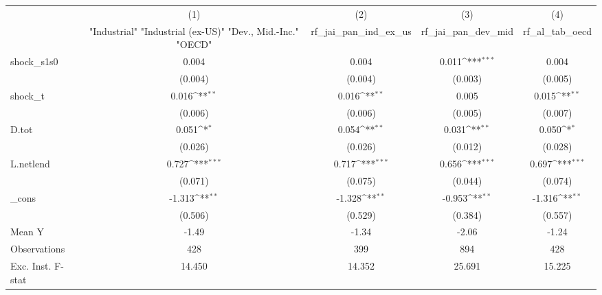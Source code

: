 {
\def\sym#1{\ifmmode^{#1}\else\(^{#1}\)\fi}
\begin{tabular}{l*{4}{c}}
\toprule
            &\multicolumn{1}{c}{(1)}&\multicolumn{1}{c}{(2)}&\multicolumn{1}{c}{(3)}&\multicolumn{1}{c}{(4)}\\
            &\multicolumn{1}{c}{ "Industrial" "Industrial (ex-US)" "Dev., Mid.-Inc." "OECD" }&\multicolumn{1}{c}{rf\_jai\_pan\_ind\_ex\_us}&\multicolumn{1}{c}{rf\_jai\_pan\_dev\_mid}&\multicolumn{1}{c}{rf\_al\_tab\_oecd}\\
\midrule
shock\_s1s0  &       0.004         &       0.004         &       0.011\sym{***}&       0.004         \\
            &     (0.004)         &     (0.004)         &     (0.003)         &     (0.005)         \\
\addlinespace
shock\_t     &       0.016\sym{**} &       0.016\sym{**} &       0.005         &       0.015\sym{**} \\
            &     (0.006)         &     (0.006)         &     (0.005)         &     (0.007)         \\
\addlinespace
D.tot       &       0.051\sym{*}  &       0.054\sym{**} &       0.031\sym{**} &       0.050\sym{*}  \\
            &     (0.026)         &     (0.026)         &     (0.012)         &     (0.028)         \\
\addlinespace
L.netlend   &       0.727\sym{***}&       0.717\sym{***}&       0.656\sym{***}&       0.697\sym{***}\\
            &     (0.071)         &     (0.075)         &     (0.044)         &     (0.074)         \\
\addlinespace
\_cons      &      -1.313\sym{**} &      -1.328\sym{**} &      -0.953\sym{**} &      -1.316\sym{**} \\
            &     (0.506)         &     (0.529)         &     (0.384)         &     (0.557)         \\
\midrule
Mean Y      &       -1.49         &       -1.34         &       -2.06         &       -1.24         \\
Observations&         428         &         399         &         894         &         428         \\
Exc. Inst. F-stat&      14.450         &      14.352         &      25.691         &      15.225         \\
\bottomrule
\end{tabular}
}
